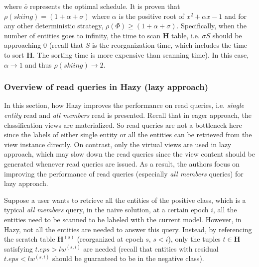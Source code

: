where $\bar{o}$ represents the optimal schedule. It is proven that $\rho(skiing) = (1+\alpha + \sigma)$ where $\alpha$ is the positive root of $x^2 + \alpha x - 1$ and for any other deterministic strategy, $\rho(\Phi) \geq (1+\alpha + \sigma)$. Specifically, when the number of entities goes to infinity, the time to scan $\textbf{H}$ table, i.e. $\sigma S$ should be approaching 0 (recall that $S$ is the reorganization time, which includes the time to sort $\textbf{H}$. The sorting time is more expensive than scanning time). In this case, $\alpha \rightarrow 1$ and thus $\rho(skiing) \rightarrow 2$.

% 




\subsubsection{Overview of read queries in Hazy (lazy approach)}
In this section, how Hazy improves the performance on read queries, i.e. {\em single entity} read and {\em all members} read is presented. Recall that in eager approach, the classification views are materialized. So read queries are not a bottleneck here since the labels of either single entity or all the entities can be retrieved from the view instance directly. On contrast, only the virtual views are used in lazy approach, which may slow down the read queries since the view content should be generated whenever read queries are issued. As a result, the authors focus on improving the performance of read queries (especially {\em all members} queries) for lazy approach.

Suppose a user wants to retrieve all the entities of the positive class, which is a typical {\em all members} query, in the naive solution, at a certain epoch $i$, all the entities need to be scanned to be labeled with the current model. However, in Hazy, not all the entities are needed to answer this query. Instead, by referencing the scratch table $\textbf{H}^{(s)}$ (reorganized at epoch $s$, $s < i$), only the tuples $t \in \textbf{H}$ satisfying $t.eps > lw^{(s,i)}$ are needed (recall that entities with residual $t.eps < lw^{(s,i)}$ should be guaranteed to be in the negative class). 

